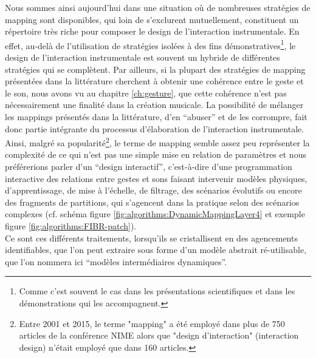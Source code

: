 \noindent Nous sommes ainsi aujourd'hui dans une situation où de nombreuses stratégies de mapping sont disponibles, qui loin de s'exclurent mutuellement, constituent un répertoire très riche pour composer le design de l'interaction instrumentale. En effet, au-delà de l'utilisation de stratégies isolées à des fins démonstratives\footnote{Comme c'est souvent le cas dans les présentations scientifiques et dans les démonstrations qui les accompagnent.}, le design de l'interaction instrumentale est souvent un hybride de différentes stratégies qui se complètent. Par ailleurs, si la plupart des stratégies de mapping présentées dans la littérature cherchent à obtenir une cohérence entre le geste et le son, nous avons vu au chapitre \ref{ch:gesture}, que cette cohérence n'est pas nécessairement une finalité dans la création musicale. La possibilité de mélanger les mappings présentés dans la littérature, d'en ``abuser'' et de les corrompre, fait donc partie intégrante du processus d'élaboration de l'interaction instrumentale.\\
\indent Ainsi, malgré sa popularité\footnote{Entre 2001 et 2015, le terme "mapping" a été employé dans plus de 750 articles de la conférence \gls{NIME} alors que "design d'interaction" (interaction design) n'était employé que dans 160 articles.}, le terme de mapping semble assez peu représenter la complexité de ce qui n'est pas une simple mise en relation de paramètres et nous préférerions parler d'un ``design interactif'', c'est-à-dire d'une programmation interactive des relations entre gestes et sons faisant intervenir modèles physiques, d'apprentissage, de mise à l'échelle, de filtrage, des scénarios évolutifs ou encore des fragments de partitions, qui s'agencent dans la pratique selon des scénarios complexes (cf. schéma figure \ref{fig:algorithms:DynamicMappingLayer4} et exemple figure \ref{fig:algorithms:FIBR-patch}).\\
\noindent Ce sont ces différents traitements, lorsqu'ils se cristallisent en des agencements identifiables, que l'on peut extraire sous forme d'un modèle abstrait ré-utilisable, que l'on nommera ici ``modèles intermédiaires dynamiques''.



